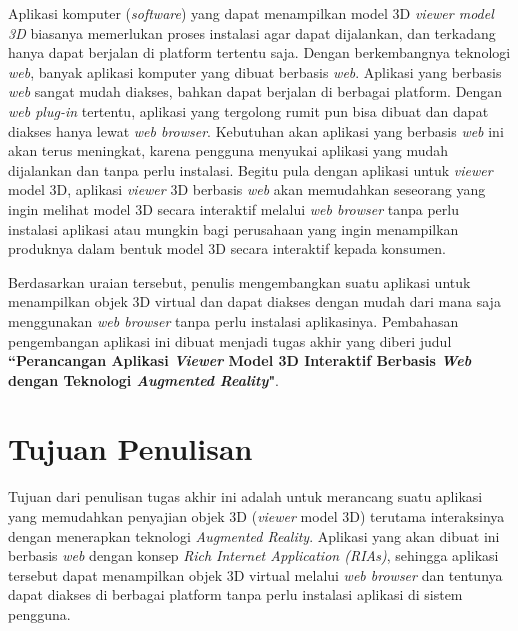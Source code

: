Aplikasi komputer (\textit{software}) yang dapat menampilkan model 3D \textit{viewer model 3D} biasanya memerlukan proses instalasi agar dapat dijalankan, dan terkadang hanya dapat berjalan di platform tertentu saja. Dengan berkembangnya teknologi \textit{web}, banyak aplikasi komputer yang dibuat berbasis \textit{web}. Aplikasi yang berbasis \textit{web} sangat mudah diakses, bahkan dapat berjalan di berbagai platform. Dengan \textit{web plug-in} tertentu, aplikasi yang tergolong rumit pun bisa dibuat dan dapat diakses hanya lewat \textit{web browser}. Kebutuhan akan aplikasi yang berbasis \textit{web} ini akan terus meningkat, karena pengguna menyukai aplikasi yang mudah dijalankan dan tanpa perlu instalasi. Begitu pula dengan aplikasi untuk \textit{viewer} model 3D, aplikasi \textit{viewer} 3D berbasis \textit{web} akan memudahkan seseorang yang ingin melihat model 3D secara interaktif melalui \textit{web browser} tanpa perlu instalasi aplikasi atau mungkin bagi perusahaan yang ingin menampilkan produknya dalam bentuk model 3D secara interaktif kepada konsumen.

Berdasarkan uraian tersebut, penulis mengembangkan suatu aplikasi untuk menampilkan objek 3D virtual dan dapat diakses dengan mudah dari mana saja menggunakan \textit{web browser} tanpa perlu instalasi aplikasinya. Pembahasan pengembangan aplikasi ini dibuat menjadi tugas akhir yang diberi judul \textbf{``Perancangan Aplikasi \textit{Viewer} Model 3D Interaktif Berbasis \textit{Web} dengan Teknologi \textit{Augmented Reality}"}.

\section{Tujuan Penulisan}
\label{sec:tujuan_penulisan}
Tujuan dari penulisan tugas akhir ini adalah untuk merancang suatu aplikasi yang memudahkan penyajian objek 3D (\textit{viewer} model 3D) terutama interaksinya dengan menerapkan teknologi \textit{Augmented Reality}. Aplikasi yang akan dibuat ini berbasis \textit{web} dengan konsep \textit{Rich Internet Application (RIAs)}, sehingga aplikasi tersebut dapat menampilkan objek 3D virtual melalui \textit{web browser} dan tentunya dapat diakses di  berbagai platform tanpa perlu instalasi aplikasi di sistem pengguna. 

